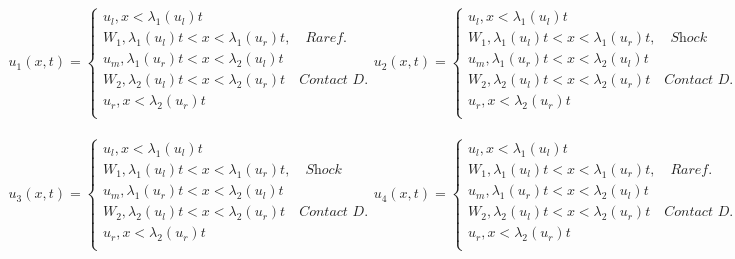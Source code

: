 \documentclass{article}
\numberwithin{equation}{section}
\begin{document}
\begin{align*}
    u_1(x,t) = \begin{cases}
    u_l, x < \lambda_1(u_l)t\\
    W_1, \lambda_1(u_l)t < x < \lambda_1(u_r)t, \quad \textit{Raref.}\\ 
    u_m, \lambda_1(u_r)t < x < \lambda_2(u_l)t \\
    W_2, \lambda_2(u_l)t < x < \lambda_2(u_r)t \quad \textit{Contact D.} \\
    u_r, x < \lambda_2(u_r)t \\
    \end{cases}
    u_2(x,t) = \begin{cases}
    u_l, x < \lambda_1(u_l)t\\
    W_1, \lambda_1(u_l)t < x < \lambda_1(u_r)t, \quad \textit{Shock}\\ 
    u_m, \lambda_1(u_r)t < x < \lambda_2(u_l)t \\
    W_2, \lambda_2(u_l)t < x < \lambda_2(u_r)t \quad \textit{Contact D.} \\
    u_r, x < \lambda_2(u_r)t \\
    \end{cases}
\end{align*}

\begin{align*}
    u_3(x,t) = \begin{cases}
    u_l, x < \lambda_1(u_l)t\\
    W_1, \lambda_1(u_l)t < x < \lambda_1(u_r)t, \quad \textit{Shock}\\ 
    u_m, \lambda_1(u_r)t < x < \lambda_2(u_l)t \\
    W_2, \lambda_2(u_l)t < x < \lambda_2(u_r)t \quad \textit{Contact D.} \\
    u_r, x < \lambda_2(u_r)t \\
    \end{cases}
    u_4(x,t) = \begin{cases}
    u_l, x < \lambda_1(u_l)t\\
    W_1, \lambda_1(u_l)t < x < \lambda_1(u_r)t, \quad \textit{Raref.}\\ 
    u_m, \lambda_1(u_r)t < x < \lambda_2(u_l)t \\
    W_2, \lambda_2(u_l)t < x < \lambda_2(u_r)t \quad \textit{Contact D.} \\
    u_r, x < \lambda_2(u_r)t \\
    \end{cases}
\end{align*}
\end{document}

